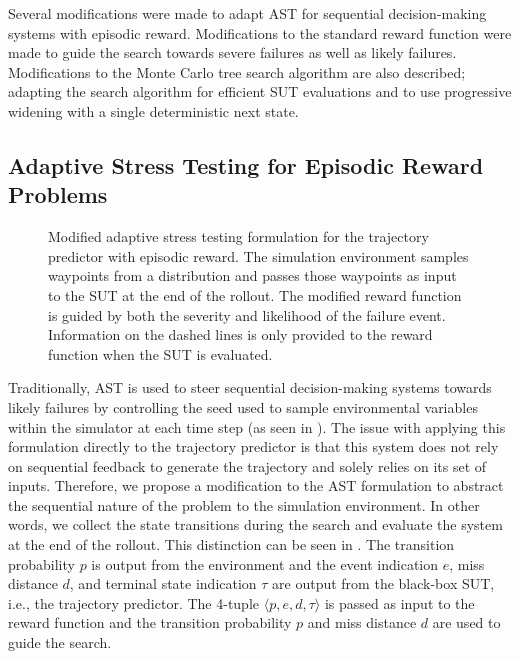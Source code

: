 Several modifications were made to adapt AST for sequential decision-making systems with episodic reward.
Modifications to the standard reward function were made to guide the search towards severe failures as well as likely failures.
Modifications to the Monte Carlo tree search algorithm are also described; adapting the search algorithm for efficient SUT evaluations and to use progressive widening with a single deterministic next state.%


\subsection{Adaptive Stress Testing for Episodic Reward Problems} \label{sec:ast_approach_ast}

\begin{figure*}[!b]
  \centering
  \resizebox{0.95\textwidth}{!}{}
  \caption{
    \label{fig:ast_mdp_modified}
    Modified adaptive stress testing formulation for the trajectory predictor with episodic reward. The simulation environment samples waypoints from a distribution and passes those waypoints as input to the SUT at the end of the rollout.
    The modified reward function is guided by both the severity and likelihood of the failure event. Information on the dashed lines is only provided to the reward function when the SUT is evaluated.
  }
\end{figure*}

Traditionally, AST is used to steer sequential decision-making systems towards likely failures by controlling the seed used to sample environmental variables within the simulator at each time step (as seen in ).
The issue with applying this formulation directly to the trajectory predictor is that this system does not rely on sequential feedback to generate the trajectory and solely relies on its set of inputs. 
Therefore, we propose a modification to the AST formulation to abstract the sequential nature of the problem to the simulation environment.
In other words, we collect the state transitions during the search and evaluate the system at the end of the rollout.
This distinction can be seen in .
The transition probability $p$ is output from the environment and the event indication $e$, miss distance $d$, and terminal state indication $\tau$ are output from the black-box SUT, i.e., the trajectory predictor.
The 4-tuple $\langle p, e, d, \tau \rangle$ is passed as input to the reward function and the transition probability $p$ and miss distance $d$ are used to guide the search.


